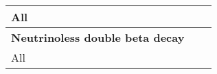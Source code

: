 \begin{table}[!htdp]
\begin{center}
\begin{tabular}{ p{3.5cm }p{3cm }p{}p{4cm}p{0cm}}
 All & \centering{Zero (unless degenerate)} & \centering{$\sim$2020}  &  \centering{Only sensitive in degenerate region }& \\ 
\hline
\multicolumn{3}{l}{\bf Neutrinoless double beta decay }\\
 All & \centering{Limited by Nature}  & \centering{$\sim$2025}   &  \centering{No scope for definitive mass hierarchy measurement}& \\
\hline \hline
\end{tabular}
\end{center}
\end{table}%


